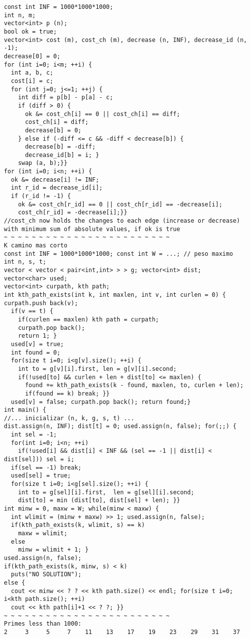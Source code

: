 \documentclass[11pt, oneside]{article}
\begin{document}
\begin{lstlisting}
const int INF = 1000*1000*1000;
int n, m;
vector<int> p (n);
bool ok = true;
vector<int> cost (m), cost_ch (m), decrease (n, INF), decrease_id (n, -1);
decrease[0] = 0;
for (int i=0; i<m; ++i) {
  int a, b, c;
  cost[i] = c;
  for (int j=0; j<=1; ++j) {
    int diff = p[b] - p[a] - c;
    if (diff > 0) {
      ok &= cost_ch[i] == 0 || cost_ch[i] == diff;
      cost_ch[i] = diff;
      decrease[b] = 0;
    } else if (-diff <= c && -diff < decrease[b]) {
      decrease[b] = -diff;
      decrease_id[b] = i; }
    swap (a, b);}}
for (int i=0; i<n; ++i) {
  ok &= decrease[i] != INF;
  int r_id = decrease_id[i];
  if (r_id != -1) {
    ok &= cost_ch[r_id] == 0 || cost_ch[r_id] == -decrease[i];
    cost_ch[r_id] = -decrease[i];}}
//cost_ch now holds the changes to each edge (increase or decrease) with minimum sum of absolute values, if ok is true
~ ~ ~ ~ ~ ~ ~ ~ ~ ~ ~ ~ ~ ~ ~ ~ ~ ~ ~ ~ ~ ~ ~ ~
K camino mas corto
const int INF = 1000*1000*1000; const int W = ...; // peso maximo
int n, s, t;
vector < vector < pair<int,int> > > g; vector<int> dist;
vector<char> used;
vector<int> curpath, kth path;
int kth_path_exists(int k, int maxlen, int v, int curlen = 0) { curpath.push back(v);
  if(v == t) {
    if(curlen == maxlen) kth path = curpath;
    curpath.pop back();
    return 1; }
  used[v] = true;
  int found = 0;
  for(size t i=0; i<g[v].size(); ++i) {
    int to = g[v][i].first, len = g[v][i].second;
    if(!used[to] && curlen + len + dist[to] <= maxlen) {
      found += kth_path_exists(k - found, maxlen, to, curlen + len);
      if(found == k) break; }}
  used[v] = false; curpath.pop back(); return found;}
int main() {
//... inicializar (n, k, g, s, t) ...
dist.assign(n, INF); dist[t] = 0; used.assign(n, false); for(;;) {
  int sel = -1;
  for(int i=0; i<n; ++i)
    if(!used[i] && dist[i] < INF && (sel == -1 || dist[i] < dist[sel])) sel = i;
  if(sel == -1) break;
  used[sel] = true;
  for(size t i=0; i<g[sel].size(); ++i) {
    int to = g[sel][i].first,  len = g[sel][i].second;
    dist[to] = min (dist[to], dist[sel] + len); }}
int minw = 0, maxw = W; while(minw < maxw) {
  int wlimit = (minw + maxw) >> 1; used.assign(n, false);
  if(kth_path_exists(k, wlimit, s) == k)
    maxw = wlimit;
  else
    minw = wlimit + 1; }
used.assign(n, false);
if(kth_path_exists(k, minw, s) < k)
  puts("NO SOLUTION");
else {
  cout << minw << ? ? << kth path.size() << endl; for(size t i=0; i<kth path.size(); ++i)
  cout << kth path[i]+1 << ? ?; }}
~ ~ ~ ~ ~ ~ ~ ~ ~ ~ ~ ~ ~ ~ ~ ~ ~ ~ ~ ~ ~ ~ ~ ~
Primes less than 1000:
2     3     5     7    11    13    17    19    23    29    31    37

\end{lstlisting}
\end{document}
